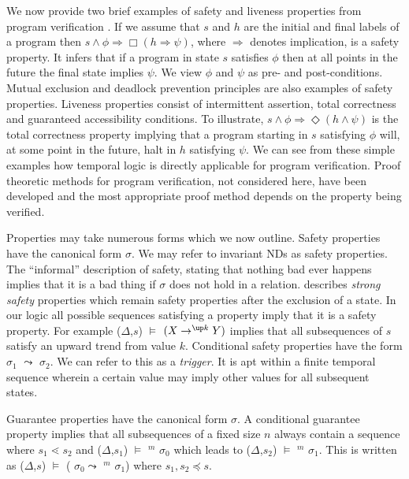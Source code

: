 \medskip

We now provide two brief examples of safety and liveness properties
from program verification \cite{eme90}. If we assume that $s$ and $h$
are the initial and final labels of a program then $s \wedge \phi
\Rightarrow \Box (h \Rightarrow \psi)$, where $\Rightarrow$ denotes
implication, is a safety property. It infers that if a program in state
$s$ satisfies $\phi$ then at all points in the future the final state
implies $\psi$. We view $\phi$ and $\psi$ as pre- and
post-conditions. Mutual exclusion and deadlock prevention principles are
also examples of safety properties.  Liveness properties consist of
intermittent assertion, total correctness and guaranteed accessibility
conditions. To illustrate, $s \wedge \phi \Rightarrow \Diamond (h
\wedge \psi)$ is the total correctness property implying that a
program starting in $s$ satisfying $\phi$ will, at some point in the
future, halt in  $h$ satisfying $\psi$. We can see from these simple
examples how temporal logic is directly applicable for program
verification. Proof theoretic methods for program verification, not
considered here, have been developed and the most appropriate proof
method depends on the property being verified.

\medskip
{}

Properties may take numerous forms which we now outline.
Safety properties have the canonical form  $\sigma$. We may
refer to invariant NDs as safety properties. The ``informal''
description of safety, stating that nothing bad ever happens implies
that it is a bad thing if $\sigma$ does not hold in a
relation. \cite{sis94} describes {\em strong safety} properties which
remain safety properties after the exclusion of a state. In our logic
all possible sequences satisfying a property imply that it is a safety
property.  For example ($\Delta$,$s$) $\models$  $(X \to^{\up
k} Y)$ implies that all 
subsequences of $s$ satisfy an upward trend from value $k$.
Conditional safety properties have the form $\sigma_1$ $\leadsto$
 $\sigma_2$. We
can refer to this as a {\em trigger}. It is apt within a finite
temporal sequence wherein a certain value may imply other values for all
subsequent states.

\medskip
Guarantee properties have the canonical form  $\sigma$.
A conditional guarantee property implies that all subsequences of
a fixed size $n$ 
always contain a sequence where $s_1 \lessdot s_2$ and
($\Delta$,$s_1$) $\models$ \diam$^{m}$ $\sigma_0$ which leads to 
($\Delta$,$s_2$) $\models$ \diam$^{m}$ $\sigma_1$. This is written as
($\Delta$,$s$) $\models$  ( $\sigma_0 \leadsto$ \diam$^{m}$
$\sigma_1$) where $s_1,s_2 \preceq s$.

